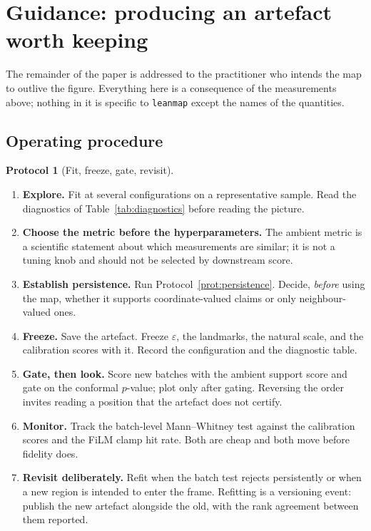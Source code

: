 \documentclass[12pt]{iopart}
\theoremstyle{definition}
\newtheorem{protocolx}{Protocol}
\theoremstyle{plain}
\theoremstyle{remark}
\newcommand{\code}[1]{\texttt{#1}}
\begin{document}
\section{Guidance: producing an artefact worth keeping}
\label{sec:guidance}

The remainder of the paper is addressed to the practitioner who intends the map
to outlive the figure. Everything here is a consequence of the measurements
above; nothing in it is specific to \code{leanmap} except the names of the
quantities.

\subsection{Operating procedure}
\label{sec:procedure}

\begin{protocolx}[Fit, freeze, gate, revisit]
\label{prot:operating}
\begin{enumerate}[leftmargin=*,nosep]
\item \textbf{Explore.} Fit at several configurations on a representative
  sample. Read the diagnostics of Table~\ref{tab:diagnostics} before reading the
  picture.
\item \textbf{Choose the metric before the hyperparameters.} The ambient metric
  is a scientific statement about which measurements are similar; it is not a
  tuning knob and should not be selected by downstream score.
\item \textbf{Establish persistence.} Run Protocol~\ref{prot:persistence}. Decide,
  \emph{before} using the map, whether it supports coordinate-valued claims or
  only neighbour-valued ones.
\item \textbf{Freeze.} Save the artefact. Freeze $\varepsilon$, the landmarks,
  the natural scale, and the calibration scores with it. Record the
  configuration and the diagnostic table.
\item \textbf{Gate, then look.} Score new batches with the ambient support
  score and gate on the conformal $p$-value; plot only after gating. Reversing
  the order invites reading a position that the artefact does not certify.
\item \textbf{Monitor.} Track the batch-level Mann--Whitney test against the
  calibration scores and the FiLM clamp hit rate. Both are cheap and both move
  before fidelity does.
\item \textbf{Revisit deliberately.} Refit when the batch test rejects
  persistently or when a new region is intended to enter the frame. Refitting is
  a versioning event: publish the new artefact alongside the old, with the
  rank agreement between them reported.
\end{enumerate}
\end{protocolx}
\end{document}
